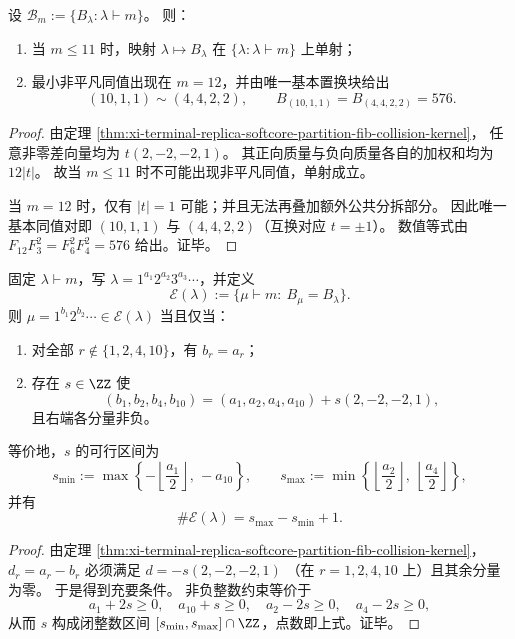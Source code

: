 \begin{corollary}[最小同值分拆块与低阶单射性]\label{cor:xi-terminal-replica-softcore-partition-fib-minimal-collision}
设 \(\mathcal B_m:=\{B_\lambda:\lambda\vdash m\}\)。
则：
\begin{enumerate}
\item 当 \(m\le 11\) 时，映射 \(\lambda\mapsto B_\lambda\) 在 \(\{\lambda:\lambda\vdash m\}\) 上单射；
\item 最小非平凡同值出现在 \(m=12\)，并由唯一基本置换块给出
\[
(10,1,1)\sim(4,4,2,2),\qquad
B_{(10,1,1)}=B_{(4,4,2,2)}=576.
\]
\end{enumerate}
\end{corollary}
\begin{proof}
由定理 \ref{thm:xi-terminal-replica-softcore-partition-fib-collision-kernel}，
任意非零差向量均为 \(t(2,-2,-2,1)\)。
其正向质量与负向质量各自的加权和均为 \(12|t|\)。
故当 \(m\le 11\) 时不可能出现非平凡同值，单射成立。

当 \(m=12\) 时，仅有 \(|t|=1\) 可能；并且无法再叠加额外公共分拆部分。
因此唯一基本同值对即
\((10,1,1)\) 与 \((4,4,2,2)\)（互换对应 \(t=\pm1\)）。
数值等式由
\(
F_{12}F_3^2=F_6^2F_4^2=576
\)
给出。证毕。
\end{proof}

\begin{proposition}[同值等价类的整数参数化与类大小]\label{prop:xi-terminal-replica-softcore-partition-fib-equivalence-class-param}
固定 \(\lambda\vdash m\)，写 \(\lambda=1^{a_1}2^{a_2}3^{a_3}\cdots\)，并定义
\[
\mathcal E(\lambda):=\{\mu\vdash m:\ B_\mu=B_\lambda\}.
\]
则 \(\mu=1^{b_1}2^{b_2}\cdots\in\mathcal E(\lambda)\) 当且仅当：
\begin{enumerate}
\item 对全部 \(r\notin\{1,2,4,10\}\)，有 \(b_r=a_r\)；
\item 存在 \(s\in\ZZ\) 使
\[
(b_1,b_2,b_4,b_{10})
=(a_1,a_2,a_4,a_{10})+s(2,-2,-2,1),
\]
且右端各分量非负。
\end{enumerate}
等价地，\(s\) 的可行区间为
\[
s_{\min}:=\max\!\left\{-\left\lfloor\frac{a_1}{2}\right\rfloor,\,-a_{10}\right\},
\qquad
s_{\max}:=\min\!\left\{\left\lfloor\frac{a_2}{2}\right\rfloor,\ \left\lfloor\frac{a_4}{2}\right\rfloor\right\},
\]
并有
\[
\#\mathcal E(\lambda)=s_{\max}-s_{\min}+1.
\]
\end{proposition}
\begin{proof}
由定理 \ref{thm:xi-terminal-replica-softcore-partition-fib-collision-kernel}，
\(
d_r=a_r-b_r
\)
必须满足
\(
d=-s(2,-2,-2,1)
\)
（在 \(r=1,2,4,10\) 上）且其余分量为零。
于是得到充要条件。
非负整数约束等价于
\[
a_1+2s\ge 0,\quad a_{10}+s\ge 0,\quad a_2-2s\ge 0,\quad a_4-2s\ge 0,
\]
从而 \(s\) 构成闭整数区间 \([s_{\min},s_{\max}]\cap\ZZ\)，点数即上式。证毕。
\end{proof}

